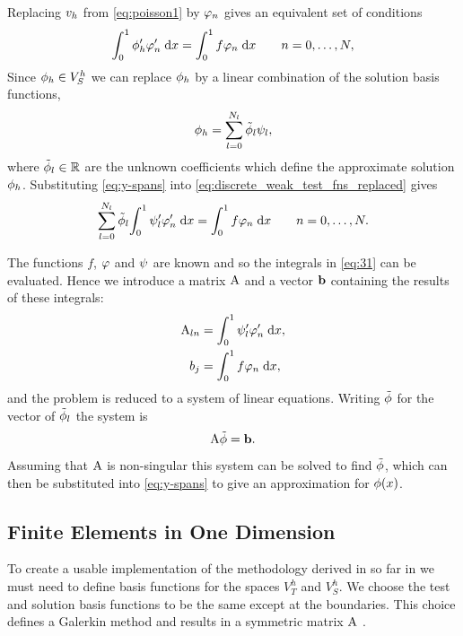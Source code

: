 Replacing ${v}_h$ from \cref{eq:poisson1} by $\varphi_{n}$ gives an equivalent set of conditions
\begin{equation}
  {\int_0^1   \phi'_h \varphi_{n}'   {\; \mathrm{{d}}}{x}}  = {\int_0^1  f\varphi_{n}  {\; \mathrm{{d}}}{x}} \qquad n=0,\ldots,N,
  \label{eq:discrete_weak_test_fns_replaced}
\end{equation}
Since ${\phi}_h\in V_{S}^{h}$ we can replace ${\phi}_h$ by a linear combination of the solution basis functions, \ie
\begin{equation}
  {\phi}_h = \sum_{l=0}^{N_l} \tilde{\phi}_l\psi_l,
  \label{eq:y-spans}
\end{equation}
where $\tilde{\phi}_l \in \mathbb{R}$ are the unknown coefficients which define the approximate solution ${\phi}_h$.
Substituting \cref{eq:y-spans} into \cref{eq:discrete_weak_test_fns_replaced} gives
\begin{equation}
  \sum_{l=0}^{N_l} \tilde{\phi}_l{\int_0^1  \psi_l'\varphi'_{n}  {\; \mathrm{{d}}}{x}} ={\int_0^1  f\varphi_{n}  {\; \mathrm{{d}}}{x}}
  \qquad n=0,\ldots,N.
  \label{eq:31}
\end{equation}

The functions $f$, $\varphi$ and $\psi$ are known and so the integrals in \cref{eq:31} can be evaluated.
Hence we introduce a matrix $\mathrm{A}$ and a vector ${\boldsymbol{\mathrm{b}}}$ containing the results of these integrals:
\begin{equation}
  \begin{aligned}
    \mathrm{A}_{ln} &= {\int_0^1  \psi_l'\varphi'_{n}  {\; \mathrm{{d}}}{x}}, \\
    b_{j} &= {\int_0^1  f\varphi_{n}  {\; \mathrm{{d}}}{x}}, \\
    \label{eq:Aij_bj}
  \end{aligned}
\end{equation}
and the problem is reduced to a system of linear equations.
Writing $\tilde{\phi}$ for the vector of $\tilde{\phi}_l$ the system is
\begin{equation}
  \mathrm{A} \tilde{\phi} = {\boldsymbol{\mathrm{b}}}.
  \label{eq:final_galerkin}
\end{equation}
Assuming that $\mathrm{A}$ is non-singular this system can be solved to find $\tilde{\phi}$, which can then be substituted into \cref{eq:y-spans} to give an approximation for $\phi(x)$.


\subsection{Finite Elements in One Dimension}
\label{sub:Actual-Finite-Elements}

To create a usable implementation of the methodology derived in so far in  we must need to define basis functions for the spaces $V_{T}^{h}$ and $V_S^h$.
We choose the test and solution basis functions to be the same except at the boundaries.
This choice defines a Galerkin method and results in a symmetric matrix $\mathrm{A}$ \cite[215]{Zeinkiewicz1967}.

